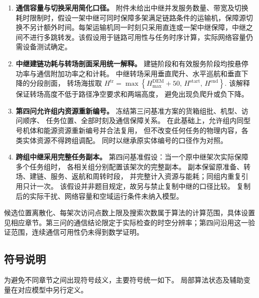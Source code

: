 \documentclass[bwprint]{gmcmthesis}
\begin{document}
\begin{enumerate}
\item \textbf{通信容量与切换采用简化口径。} 附件未给出中继并发服务数量、带宽及切换耗时限制时，假设一架中继可同时保障多架满足链路条件的运输机，保障源切换不另计额外时间。每架运输机同一时刻只采用直连或一架中继保障，中继之间不进行多跳转发。该假设用于链路可用性与任务时序计算，实际网络容量仍需设备测试确定。

    \item \textbf{中继建链功耗与转场剖面采用统一解释。}
    建链阶段和有效服务阶段均按悬停功率与通信附加功率之和计耗。
    中继转场采用垂直爬升、水平巡航和垂直下降的分段剖面，
    转场海拔取
\(H^{\mathrm{tr}} = \max\left\{ H^{\mathrm{DEM}}_{\max}+50,\, H^{\mathrm{start}},\, H^{\mathrm{end}} \right\}\).
    该解释保证转场高度不低于路径净空要求和两端高度，
    避免出现负爬升或负下降。

    \item \textbf{第四问允许组内资源重新编号。}
    冻结第三问基准方案的货箱组批、机型、访问顺序、
    任务位置、全部时刻及通信保障关系。
    在此基础上，允许组内同型号机体和能源资源重新编号并合法复用，
    但不改变任何任务的物理内容，各类实体资源不得跨组调配。
    同时以继承原实体编号的口径作为对照。

    \item \textbf{跨组中继采用完整任务副本。}
    第四问基准假设：当一个原中继架次实际保障多个任务组时，
    各相关组分别配置该架次的完整副本。
    副本保留原准备、转场、建链、服务、返航和周转时段，
    并完整计入资源与能耗；同组内重复引用只计一次。
    该假设并非题目规定，故另与禁止复制中继的口径比较。
    复制后的实际干扰、网络容量和空域运行条件未纳入模型。

\end{enumerate}

候选位置离散化、每架次访问点数上限及搜索次数属于算法的计算范围，具体设置见相应章节。第三问的通信结论限定于实际检查的时空分辨率；第四问沿用这一验证范围，连续通信可用性仍未得到数学证明。

\subsection{符号说明}

为避免不同章节之间出现符号歧义，主要符号统一如下。
局部算法状态及辅助变量在对应模型中另行定义。
\end{document}
